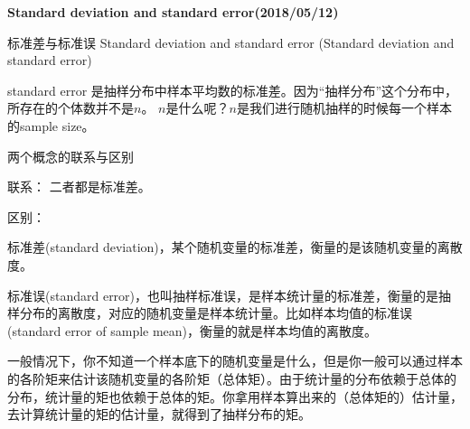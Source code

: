 \documentclass[UTF8, a4paper, 11pt, onecolumn]{article}
\begin{document}
\begin{center}
{\Large {\bf Standard deviation and standard error(2018/05/12)}} \\
\end{center}
标准差与标准误
Standard deviation and standard error
(Standard deviation and standard error)


standard error 是抽样分布中样本平均数的标准差。因为“抽样分布”这个分布中，所存在的个体数并不是$n$。
$n$是什么呢？$n$是我们进行随机抽样的时候每一个样本的sample size。

两个概念的联系与区别

联系：
二者都是标准差。

区别： 

标准差(standard deviation)，某个随机变量的标准差，衡量的是该随机变量的离散度。

标准误(standard error)，也叫抽样标准误，是样本统计量的标准差，衡量的是抽样分布的离散度，对应的随机变量是样本统计量。比如样本均值的标准误(standard error of sample mean)，衡量的就是样本均值的离散度。


一般情况下，你不知道一个样本底下的随机变量是什么，但是你一般可以通过样本的各阶矩来估计该随机变量的各阶矩（总体矩）。由于统计量的分布依赖于总体的分布，统计量的矩也依赖于总体的矩。你拿用样本算出来的（总体矩的）估计量，去计算统计量的矩的估计量，就得到了抽样分布的矩。
\end{document}

